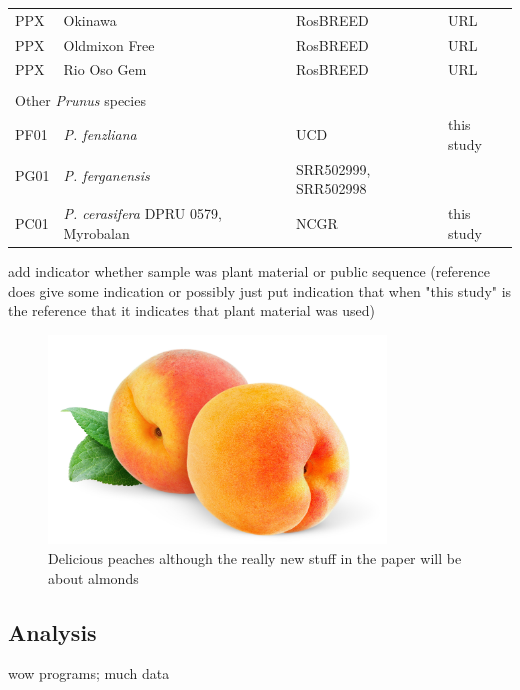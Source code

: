 \documentclass[12pt]{article}
\begin{document}
\begin{center}
\begin{longtable}{lllll}
                 PP{\color{red}X} &Okinawa & &RosBREED &URL \\
                 PP{\color{red}X} &Oldmixon Free & &RosBREED &URL \\
                 PP{\color{red}X} &Rio Oso Gem & &RosBREED &URL \\
                 \multicolumn{5}{l}{} \\
                 \multicolumn{5}{l}{Other {\em{Prunus}} species}  \\
                 PF01 &{\em{P. fenzliana}} & &UCD &this study\\
                 PG01 &{\em{P. ferganensis}} & &\multirow{2}{1cm}{SRR502999, SRR502998} &\citep{verde2013high}\\
                 \\
                 PC01 &{\em{P. cerasifera}} DPRU 0579, Myrobalan & &NCGR &this study\\ \hline

\end{longtable}
\end{center}

add indicator whether sample was plant material or public sequence (reference does give some indication or possibly just put indication that when "this study" is the reference that it indicates that plant material was used)

\begin{figure}[b]
\centering
   \includegraphics[width=0.8\textwidth]{peachzdfgad.jpg}
  \caption{Delicious peaches although the really new stuff in the paper will be about almonds}
  \label{fig:peach}
\end{figure}



\subsection*{Analysis}
wow programs; much data


\end{document}
